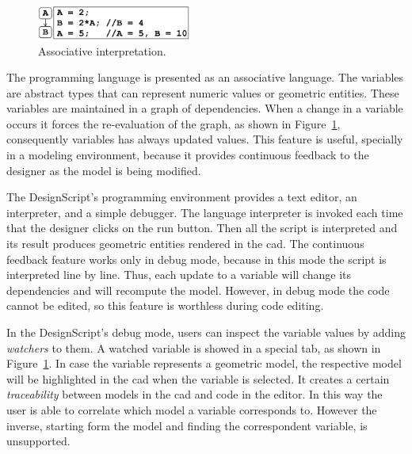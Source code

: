 \begin{figure}
  \vspace{-5pt}
  \begin{center}
    \includegraphics[width=0.45\textwidth]{img/designscript}
  \end{center}
  \vspace{-20pt}
 \caption{Associative interpretation.}  
  \vspace{-20pt}
    \label{fig:designscript}
\end{figure}

The programming language is presented as an associative language. The variables are abstract types that can represent numeric values or geometric entities. These variables are maintained in a graph of dependencies. When a change in a variable occurs it forces the re-evaluation of the graph, as shown in Figure~\ref{fig:designscript}, consequently variables has always updated values. This feature is useful, specially in a modeling environment, because it provides continuous feedback to the designer as the model is being modified.

The DesignScript's programming environment provides a text editor, an interpreter, and a simple debugger. The language interpreter is invoked each time that the designer clicks on the run button. Then all the script is interpreted and its result produces geometric entities rendered in the \ac{cad}. The continuous feedback feature works only in debug mode, because in this mode the script is interpreted line by line. Thus, each update to a variable will change its dependencies and will recompute the model. However, in debug mode the code cannot be edited, so this feature is worthless during code editing.

In the DesignScript's debug mode, users can inspect the variable values by adding \textit{watchers} to them. A watched variable is showed in a special tab, as shown in Figure~\ref{fig:designscript}. In case the variable represents a geometric model, the respective model will be highlighted in the \ac{cad} when the variable is selected. It creates a certain \textit{traceability} between models in the \ac{cad} and code in the editor. In this way the user is able to correlate which model a variable corresponds to. However the inverse, starting form the model and finding the correspondent variable, is unsupported.

